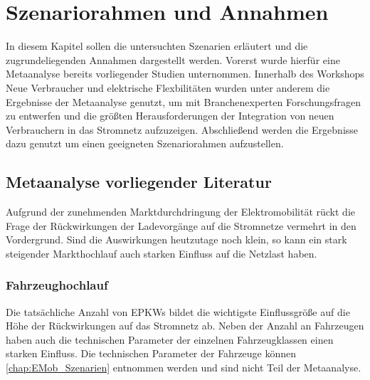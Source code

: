 
\section{Szenariorahmen und Annahmen}\label{chap:Szenariorahmen}

In diesem Kapitel sollen die untersuchten Szenarien erläutert und die zugrundeliegenden Annahmen dargestellt werden.
Vorerst wurde hierfür eine Metaanalyse bereits vorliegender Studien unternommen.
Innerhalb des Workshops \glqq Neue Verbraucher und elektrische Flexbilitäten\grqq{} wurden unter anderem die Ergebnisse der Metaanalyse genutzt, um mit Branchenexperten Forschungsfragen zu entwerfen und die größten Herausforderungen der Integration von neuen Verbrauchern in das Stromnetz aufzuzeigen.
Abschließend werden die Ergebnisse dazu genutzt um einen geeigneten Szenariorahmen aufzustellen.


\subsection{Metaanalyse vorliegender Literatur}\label{chap:Metaanalyse}

Aufgrund der zunehmenden Marktdurchdringung der Elektromobilität rückt die Frage der Rückwirkungen der Ladevorgänge auf die Stromnetze vermehrt in den Vordergrund.
Sind die Auswirkungen heutzutage noch klein, so kann ein stark steigender Markthochlauf auch starken Einfluss auf die Netzlast haben.


\subsubsection{Fahrzeughochlauf}

Die tatsächliche Anzahl von \glspl{EPKW} bildet die wichtigste Einflussgröße auf die Höhe der Rückwirkungen auf das Stromnetz ab.
Neben der Anzahl an Fahrzeugen haben auch die technischen Parameter der einzelnen Fahrzeugklassen einen starken Einfluss.
Die technischen Parameter der Fahrzeuge können \autoref{chap:EMob_Szenarien} entnommen werden und sind nicht Teil der Metaanalyse.



